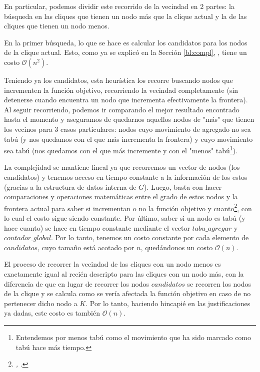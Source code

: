 \par En particular, podemos dividir este recorrido de la vecindad en 2
    partes: la b\'usqueda en las cliques que tienen un nodo m\'as que la
    clique actual y la de las cliques que tienen un nodo menos.

\par En la primer b\'usqueda, lo que se hace es calcular los candidatos
    para los nodos de la clique actual. Esto, como ya se explic\'o en
    la Secci\'on \ref{bl:compl}, \emph{}, tiene
    un costo $\mathcal O(n^2)$. 

\par Teniendo ya los candidatos, esta heur\'istica los recorre buscando
    nodos que incrementen la funci\'on objetivo, recorriendo la vecindad
    completamente (sin detenerse cuando encuentra un nodo que incrementa
    efectivamente la frontera). Al seguir recorriendo, podemos ir comparando
    el mejor resultado encontrado hasta el momento y aseguramos de quedarnos
    aquellos nodos de "m\'as" que tienen los vecinos para 3 casos particulares:
    nodos cuyo movimiento de agregado no sea tab\'u (y nos quedamos con el que
    m\'as incrementa la frontera) y cuyo movimiento sea tab\'u (nos
    quedamos con el que m\'as incremente y con el "menos" tab\'u\footnote{%
    Entendemos por menos tab\'u como el movimiento que ha sido marcado como
    tab\'u hace m\'as tiempo.}).

\par La complejidad se mantiene lineal ya que recorremos un vector de nodos
    (los candidatos) y tenemos acceso en tiempo constante a la informaci\'on
    de los estos (gracias a la estructura de datos interna de $G$). Luego,
    basta con hacer comparaciones y operaciones matem\'aticas entre el grado
    de estos nodos y la frontera actual para saber si incrementan o no la
    funci\'on objetivo y cuanto\footnote{\emph{,
    }.}, con lo cual el costo sigue siendo constante.
    Por \'ultimo, saber si un nodo es tab\'u (y hace cuanto) se hace
    en tiempo constante mediante el vector $tabu\_agregar$ y $contador\_global$.
    Por lo tanto, tenemos un costo constante por cada elemento de $candidatos$,
    cuyo tama\~no est\'a acotado por $n$, qued\'andonos un costo $\mathcal O(n)$.

\par El proceso de recorrer la vecindad de las cliques con un nodo menos es
    exactamente igual al reci\'en descripto para las cliques con un nodo m\'as,
    con la diferencia de que en lugar de recorrer los nodos $candidatos$ se
    recorren los nodos de la clique y se calcula como se ver\'ia afectada
    la funci\'on objetivo en caso de no pertenecer dicho nodo a $K$. Por
    lo tanto, haciendo hincapi\'e en las justificaciones ya dadas, este
    costo es tambi\'en $\mathcal O(n)$.

